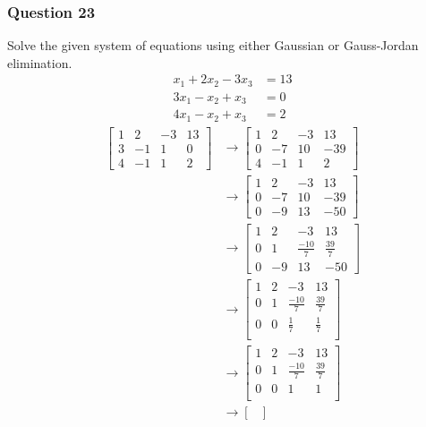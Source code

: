 \documentclass{math}
\begin{document}
\subsubsection*{Question 23}
Solve the given system of equations using either Gaussian or Gauss-Jordan
elimination.
\begin{align*}
  x_1+2x_2-3x_3 &= 13 \\
  3x_1-x_2+x_3 &= 0 \\
  4x_1-x_2+x_3 &= 2
\end{align*}
\begin{align*}
  \begin{bmatrix}
    1 & 2 & -3 & 13 \\
    3 & -1 & 1 & 0 \\
    4 & -1 & 1 & 2
  \end{bmatrix} &\to \begin{bmatrix}
    1 & 2 & -3 & 13 \\
    0 & -7 & 10 & -39 \\
    4 & -1 & 1 & 2
  \end{bmatrix} \\
  &\to \begin{bmatrix}
    1 & 2 & -3 & 13 \\
    0 & -7 & 10 & -39 \\
    0 & -9 & 13 & -50
  \end{bmatrix} \\
  &\to \begin{bmatrix}
    1 & 2 & -3 & 13 \\
    0 & 1 & \frac{-10}{7} & \frac{39}{7} \\
    0 & -9 & 13 & -50
  \end{bmatrix} \\
  &\to \begin{bmatrix}
    1 & 2 & -3 & 13 \\
    0 & 1 & \frac{-10}{7} & \frac{39}{7} \\
    0 & 0 & \frac{1}{7} & \frac{1}{7} \\
  \end{bmatrix} \\
  &\to \begin{bmatrix}
    1 & 2 & -3 & 13 \\
    0 & 1 & \frac{-10}{7} & \frac{39}{7} \\
    0 & 0 & 1 & 1 \\
  \end{bmatrix} \\
  &\to \begin{bmatrix}

\end{bmatrix}
\end{align*}
\end{document}
